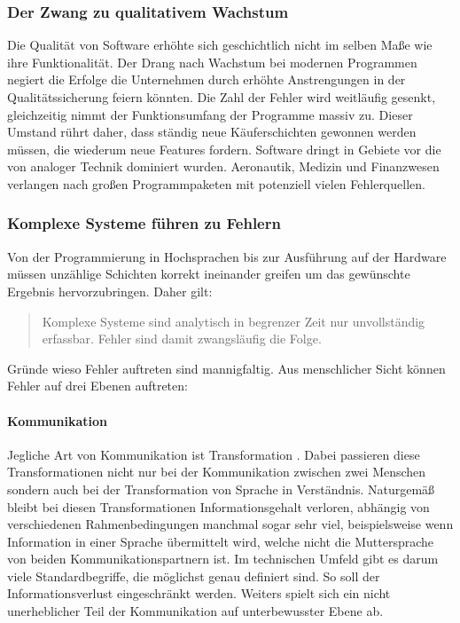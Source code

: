 \subsubsection{Der Zwang zu qualitativem Wachstum}
Die Qualität von Software erhöhte sich geschichtlich nicht im selben Maße wie ihre Funktionalität. Der Drang nach Wachstum bei modernen Programmen negiert die Erfolge die Unternehmen durch erhöhte Anstrengungen in der Qualitätssicherung feiern könnten. Die Zahl der Fehler wird weitläufig gesenkt,  gleichzeitig nimmt der Funktionsumfang der Programme massiv zu. Dieser Umstand rührt daher, dass ständig neue Käuferschichten gewonnen werden müssen, die wiederum neue Features fordern.
Software dringt in Gebiete vor die von analoger Technik dominiert wurden. Aeronautik, Medizin und Finanzwesen verlangen nach großen Programmpaketen mit potenziell vielen Fehlerquellen.

\subsubsection{Komplexe Systeme führen zu Fehlern}
Von der Programmierung in Hochsprachen bis zur Ausführung auf der Hardware müssen unzählige Schichten korrekt ineinander greifen um das gewünschte Ergebnis hervorzubringen. 
Daher gilt:

\begin{quote}
Komplexe Systeme sind analytisch in begrenzer Zeit nur unvollständig erfassbar. Fehler sind damit zwangsläufig die Folge. \cite{vigenschow_objektorientiertes_2004}
\end{quote}

Gründe wieso Fehler auftreten sind mannigfaltig. Aus menschlicher Sicht können Fehler auf drei Ebenen auftreten: \cite{vigenschow_objektorientiertes_2004} 

\paragraph{Kommunikation}
Jegliche Art von Kommunikation ist Transformation \cite{shannon_mathematische_1976}. Dabei passieren diese Transformationen nicht nur bei der Kommunikation zwischen zwei Menschen sondern auch bei der Transformation von Sprache in Verständnis. Naturgemäß bleibt bei diesen Transformationen Informationsgehalt verloren, abhängig von verschiedenen Rahmenbedingungen manchmal sogar sehr viel, beispielsweise wenn Information in einer Sprache übermittelt wird, welche nicht die Muttersprache von beiden Kommunikationspartnern ist.
Im technischen Umfeld gibt es darum viele Standardbegriffe, die möglichst genau definiert sind. So soll der Informationsverlust eingeschränkt werden.
Weiters spielt sich ein nicht unerheblicher Teil der Kommunikation auf unterbewusster Ebene ab.

